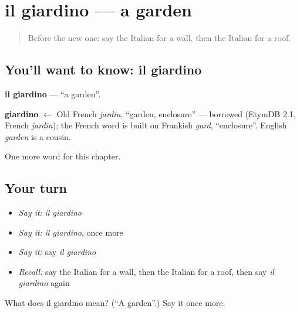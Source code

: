 \section[il giardino]{il giardino — a garden}

\label{lesson:IT-C57-giardino}



\begin{quote}
Before the new one: say the Italian for a wall, then the Italian for a roof.
\end{quote}

\subsection*{You'll want to know: il giardino}
\textbf{il giardino} — \textquotedblleft{}a garden\textquotedblright{}.

\begin{cousinweb}
\textbf{giardino} $\leftarrow$ Old French \emph{jardin}, \textquotedblleft{}garden, enclosure\textquotedblright{} — borrowed (EtymDB 2.1, French \emph{jardin}); the French word is built on Frankish \emph{gard}, \textquotedblleft{}enclosure\textquotedblright{}. English \emph{garden} is a cousin.
\end{cousinweb}

\begin{grammarlens}[title={What you've built}]
One more word for this chapter.
\end{grammarlens}

\subsection*{Your turn}
\begin{itemize}
\raggedright
  \item \emph{Say it:} \emph{il giardino}
  \item \emph{Say it:} \emph{il giardino}, once more
  \item \emph{Say it:} say \emph{il giardino}
  \item \emph{Recall:} say the Italian for a wall, then the Italian for a roof, then say \emph{il giardino} again
\end{itemize}

\begin{tcolorbox}[breakable,colback=teal!4,colframe=teal!35!black,title={Before you move on}]
What does il giardino mean? (\textquotedblleft{}A garden\textquotedblright{}.) Say it once more.
\end{tcolorbox}
